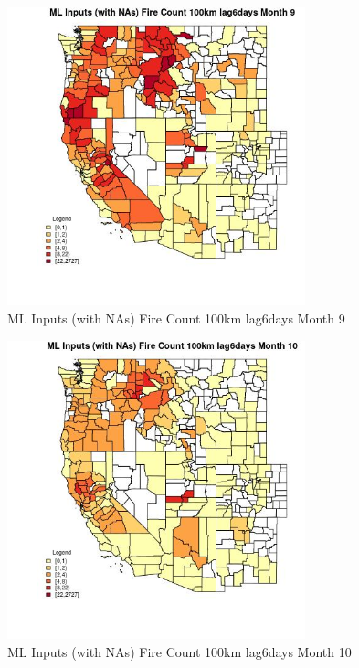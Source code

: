\clearpage 

\begin{figure} 
\centering  
\includegraphics[width=0.77\textwidth]{Code_Outputs/Report_ML_input_PM25_Step4_part_f_de_duplicated_aves_prioritize_24hr_obswNAs_CountyFire_Count_100km_lag6daysmedianMonth9.jpg} 
\caption{\label{fig:Report_ML_input_PM25_Step4_part_f_de_duplicated_aves_prioritize_24hr_obswNAsCountyFire_Count_100km_lag6daysmedianMonth9}ML Inputs (with NAs) Fire Count 100km lag6days Month 9} 
\end{figure} 
 

\begin{figure} 
\centering  
\includegraphics[width=0.77\textwidth]{Code_Outputs/Report_ML_input_PM25_Step4_part_f_de_duplicated_aves_prioritize_24hr_obswNAs_CountyFire_Count_100km_lag6daysmedianMonth10.jpg} 
\caption{\label{fig:Report_ML_input_PM25_Step4_part_f_de_duplicated_aves_prioritize_24hr_obswNAsCountyFire_Count_100km_lag6daysmedianMonth10}ML Inputs (with NAs) Fire Count 100km lag6days Month 10} 
\end{figure} 
 


